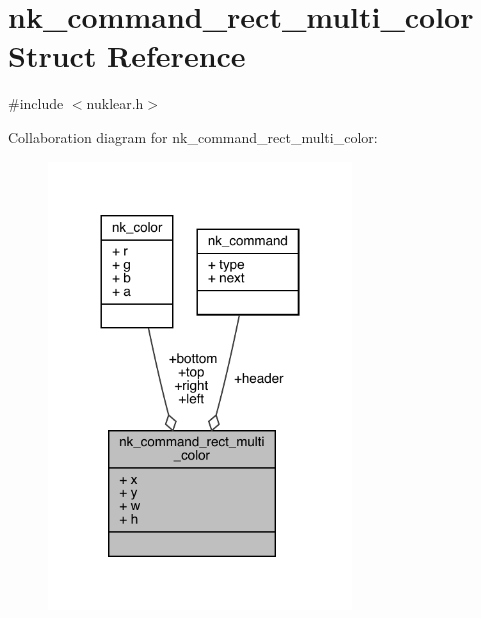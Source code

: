 \hypertarget{structnk__command__rect__multi__color}{}\section{nk\+\_\+command\+\_\+rect\+\_\+multi\+\_\+color Struct Reference}
\label{structnk__command__rect__multi__color}


{\ttfamily \#include $<$nuklear.\+h$>$}



Collaboration diagram for nk\+\_\+command\+\_\+rect\+\_\+multi\+\_\+color\+:
\nopagebreak
\begin{figure}[H]
\begin{center}
\leavevmode
\includegraphics[width=228pt]{structnk__command__rect__multi__color__coll__graph}
\end{center}
\end{figure}
